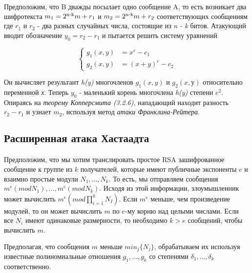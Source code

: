   Предположим, что B дважды посылает одно сообщение A, то есть возникает два шифротекста \textit{{$ m_1 = 2\textsuperscript{n-k}m + r_1 $}} и
  \textit{{$ m_2 = 2\textsuperscript{n-k}m + r_2 $}} соответствующих сообщениям где \textit{{$r_1$}} и \textit{{$r_2$}} - два разных случайных числа, состоящие из 
  \textit{n - k} битов. Атакующий вводит обозначение \textit{{$ y_0 = r_2 - r_1 $}} и пытается решить
  систему уравнений
  
    \begin{equation}
	  \begin{cases}
	    g_1(x,y) &= x^e - c_1 \\
	    g_2(x,y) &= (x+y)^e - c_2
	  \end{cases}    
      \end{equation}
      
  Он вычисляет результант \textit{h(y)} многочленов \textit{{$g_1(x,y)$}} и \textit{{$g_2(x,у)$}} относительно переменной \textit{х}. Теперь \textit{{$y_0$}} -
  маленький корень многочлена \textit{h(y)} степени \textit{{$e^2$}}. Опираясь на \textit{теорему Копперсмита (3.2.6)}, нападающий находит разность \textit{{$r_2 - r_1$}} и 
  узнает \textit{{$m_2$}}, используя метод \textit{атаки Франклина-Рейтера}.

\subsection{Расширенная атака Хастаадта}

\paragraph{} Предположим, что мы хотим транслировать простое RSA зашифрованное сообщение к группе из {$k$} получателей, которые имеют публичные
  экспоненты {$e$} и взаимно простые модули {$N_1, \dots, N_k$}. То есть, мы отправляем сообщения {$m^e (mod N_1), \dots, m^e (mod N_k)$}. 
  Исходя из этой информации, злоумышленник может вычислить {$m^e (mod \prod_{i=1}^{k}{N_I})$}. Если {$m^e$} меньше, чем произведение модулей, то он 
  может вычислить {$m$} по {$e$}-му корню над целыми числами. Если все {$N_i$} имеют одинаковые размерности, то необходимо {$k > e$} сообщений,
  чтобы вычислить {$m$}.
  
  Предполагая, что сообщения {$m$} меньше {$min_j \{ N_j \}$}, обрабатываем их используя известные полиномиальные отношения {$g_1, \dots, g_k$}
  со степенями {$\delta_1, \dots, \delta_k$} соответственно.
  
